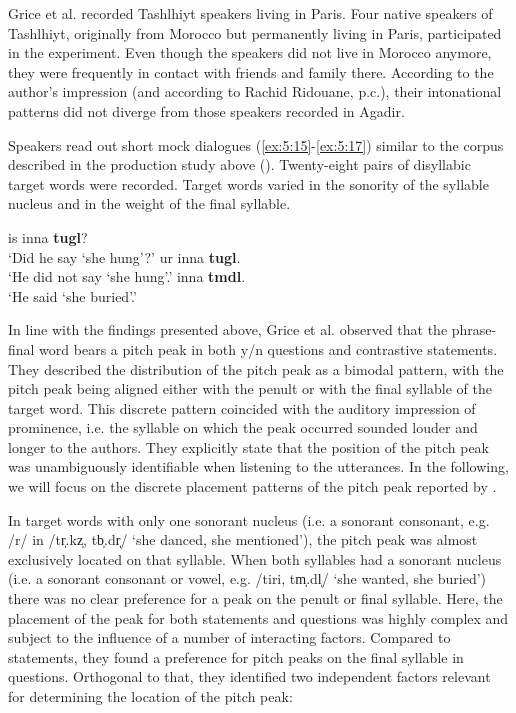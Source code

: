 Grice et al. recorded Tashlhiyt speakers living in Paris. Four native speakers of Tashlhiyt, originally from Morocco but permanently living in Paris, participated in the experiment. Even though the speakers did not live in Morocco anymore, they were frequently in contact with friends and family there. According to the author's impression (and according to Rachid Ridouane, p.c.), their intonational patterns did not diverge from those speakers recorded in Agadir. 

 
Speakers read out short mock dialogues (\ref{ex:5:15}-\ref{ex:5:17}) similar to the corpus described in the production study above (). Twenty-eight pairs of disyllabic target words were recorded. Target words varied in the sonority of the syllable nucleus and in the weight of the final syllable.

\begin{exe}
\ex\label{ex:5:15} is inna \textbf{tugl}? \\ 		
‘Did he \textbf{}say ‘she hung’?’
\ex\label{ex:5:16} ur inna \textbf{tugl}. \\		
‘He did not say ‘she hung’.’
\ex\label{ex:5:17} inna \textbf{tmdl}. \\	
‘He said ‘she buried’.’
\end{exe}

In line with the findings presented above, Grice et al. observed that the phrase-final word bears a pitch peak in both y/n questions and contrastive statements. They described the distribution of the pitch peak as a bimodal pattern, with the pitch peak being aligned either with the penult or with the final syllable of the target word. This discrete pattern coincided with the auditory impression of prominence, i.e. the syllable on which the peak occurred sounded louder and longer to the authors. They explicitly state that the position of the pitch peak was unambiguously identifiable when listening to the utterances. In the following, we will focus on the discrete placement patterns of the pitch peak reported by \citet{Grice.etal2015tash}. 

In target words with only one sonorant nucleus (i.e. a sonorant consonant, e.g. /r/ in /tr̩.kz̩, tb̩.dr̩/ ‘she danced, she mentioned’), the pitch peak was almost exclusively located on that syllable. When both syllables had a sonorant nucleus (i.e. a sonorant consonant or vowel, e.g. /tiri, tm̩.dl̩/ ‘she wanted, she buried’) there was no clear preference for a peak on the penult or final syllable. Here, the placement of the peak for both statements and questions was highly complex and subject to the influence of a number of interacting factors. Compared to statements, they found a preference for pitch peaks on the final syllable in questions. Orthogonal to that, they identified two independent factors relevant for determining the location of the pitch peak: 

